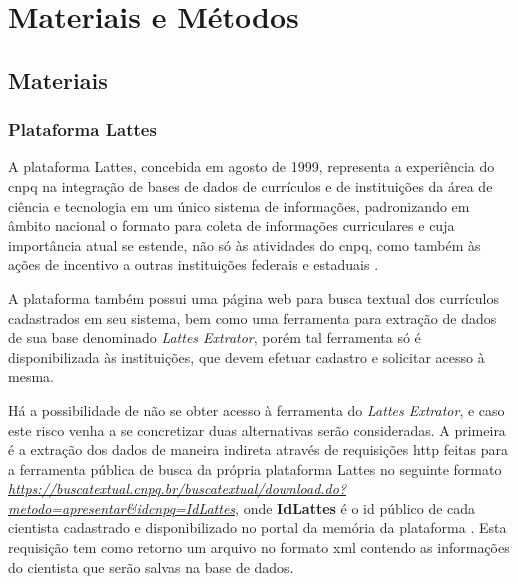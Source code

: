 \chapter{Materiais e Métodos}\label{cap:materialemetodos}

\section{Materiais}\label{sec:materiais}

\subsection{Plataforma Lattes}\label{subsec:lattes}

A plataforma Lattes, concebida em agosto de 1999, representa a experiência do \gls{cnpq} na integração de bases de dados de currículos e de instituições da área de ciência e tecnologia em um único sistema de informações, padronizando em âmbito nacional o formato para coleta de informações curriculares e cuja importância atual se estende, não só às atividades do \gls{cnpq}, como também às ações de incentivo a outras instituições federais e estaduais \cite{Lattes}.

A plataforma também possui uma página web para busca textual dos currículos cadastrados em seu sistema, bem como uma ferramenta para extração de dados de sua base denominado \textit{Lattes Extrator}, porém tal ferramenta só é disponibilizada às instituições, que devem efetuar cadastro e solicitar acesso à mesma.

Há a possibilidade de não se obter acesso à ferramenta do \textit{Lattes Extrator}, e caso este risco venha a se concretizar duas alternativas serão consideradas. A primeira é a extração dos dados de maneira indireta através de requisições \gls{http} feitas para a ferramenta pública de busca da própria plataforma Lattes no seguinte formato \textit{\url{https://buscatextual.cnpq.br/buscatextual/download.do?metodo=apresentar&idcnpq=IdLattes}}, onde \textbf{IdLattes} é o id público de cada cientista cadastrado e disponibilizado no portal da memória da plataforma \cite{CnpqMemoria}. Esta requisição tem como retorno um arquivo no formato \gls{xml} contendo as informações do cientista que serão salvas na base de dados.

